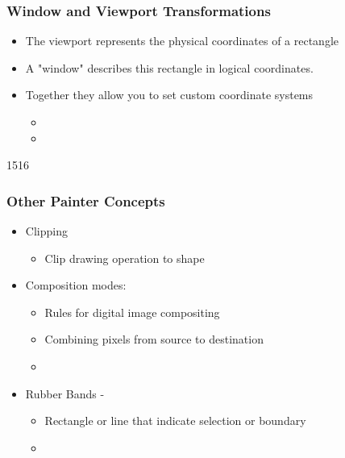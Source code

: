 \begin{slide}\frametitle{Window and Viewport Transformations}
\begin{itemize}
\item The viewport represents the physical coordinates of a rectangle
\item A "window" describes this rectangle in logical coordinates.
\item Together they allow you to set custom coordinate systems
  \begin{itemize}
  \item {}
  \item {}
  \end{itemize}
\end{itemize}
\end{slide}

\begin{slide}{1516}\frametitle{Other Painter Concepts}
  \begin{itemize}
  \item Clipping
    \begin{itemize}
    \item Clip drawing operation to shape
    \end{itemize}
  \item Composition modes:
    \begin{itemize}
    \item Rules for digital image compositing
    \item Combining pixels from source to destination
    \item[] 
    \end{itemize}
  \item Rubber Bands - 
    \begin{itemize}
    \item Rectangle or line that indicate selection or boundary
    \item {}
    \end{itemize}
  \end{itemize}  
\end{slide}

